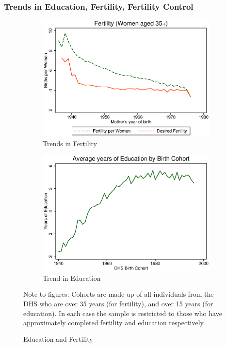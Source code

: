 \documentclass[10pt,letterpaper,subeqn]{beamer}
\begin{document}
\begin{frame}[label=Macro]
\frametitle{Trends in Education, Fertility, Fertility Control}
\begin{figure}[htpb!]
\centering
\begin{subfigure}{.5\textwidth}
  \centering
  \includegraphics[scale=0.37]{./figures/ferttrend_35_all.eps}
  \caption{Trends in Fertility}
  \label{TWINfig:fertrend}
\end{subfigure}%
\begin{subfigure}{.5\textwidth}
  \centering
  \includegraphics[scale=0.35]{./figures/eductrend_all.eps}
  \caption{Trend in Education}
  \label{TWINfig:eductrend}
\end{subfigure}
\caption{Education and Fertility}
\label{TWINfig:trends}
\footnotesize{Note to figures: Cohorts are made up of all individuals 
from the DHS who are over 35 years (for fertility), and over 15 years (for education).  
In each case the sample is restricted to those who have approximately completed fertility 
and education respectively.}
\end{figure}
\end{frame}
\end{document}
